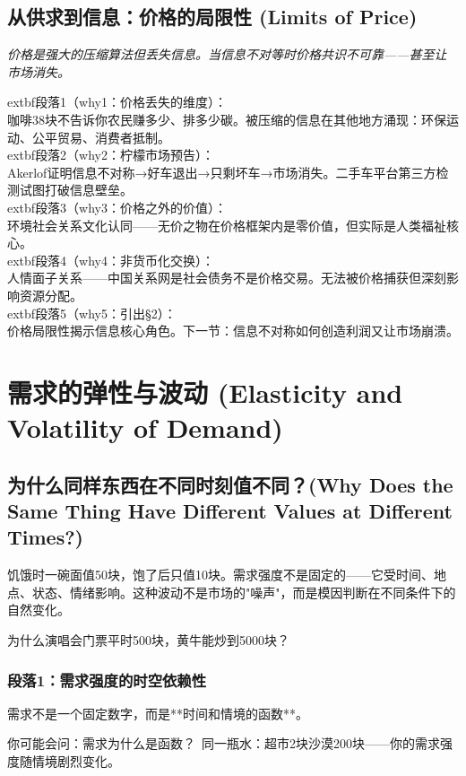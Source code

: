 \documentclass[openany, a4paper, 12pt]{book}
\newenvironment{motivation}{
	\vspace{0.5em}
	\begin{tcolorbox}[
		colback=gray!10,           %
		colframe=gray!60,          %
		title=\textit{本章动机 (Motivation)},
		fonttitle=\bfseries,
		arc=0mm,                   %
		leftrule=3mm               %
		]
		\small \itshape %
	}{
	\end{tcolorbox}
	\vspace{1em}
}
\begin{document}
	\subsection{从供求到信息：价格的局限性 (Limits of Price)}
	\begin{motivation}价格是强大的压缩算法但丢失信息。当信息不对等时价格共识不可靠——甚至让市场消失。\end{motivation}
		extbf{段落1（why1：价格丢失的维度）}：\\咖啡38块不告诉你农民赚多少、排多少碳。被压缩的信息在其他地方涌现：环保运动、公平贸易、消费者抵制。\\	extbf{段落2（why2：柠檬市场预告）}：\\Akerlof证明信息不对称→好车退出→只剩坏车→市场消失。二手车平台第三方检测试图打破信息壁垒。\\	extbf{段落3（why3：价格之外的价值）}：\\环境社会关系文化认同——无价之物在价格框架内是零价值，但实际是人类福祉核心。\\	extbf{段落4（why4：非货币化交换）}：\\人情面子关系——中国关系网是社会债务不是价格交易。无法被价格捕获但深刻影响资源分配。\\	extbf{段落5（why5：引出§2）}：\\价格局限性揭示信息核心角色。下一节：信息不对称如何创造利润又让市场崩溃。


	\section{需求的弹性与波动 (Elasticity and Volatility of Demand)}

	\subsection{为什么同样东西在不同时刻值不同？(Why Does the Same Thing Have Different Values at Different Times?)}
	\begin{motivation}
		饥饿时一碗面值50块，饱了后只值10块。需求强度不是固定的——它受时间、地点、状态、情绪影响。这种波动不是市场的"噪声"，而是模因判断在不同条件下的自然变化。
	\end{motivation}
	\begin{questionbox}
		为什么演唱会门票平时500块，黄牛能炒到5000块？
	\end{questionbox}

	\subsubsection*{段落1：需求强度的时空依赖性}
	需求不是一个固定数字，而是**时间和情境的函数**。
	\begin{tcolorbox}[colback=yellow!5, title=\textit{读者行为预测}]
		你可能会问：需求为什么是函数？\ 同一瓶水：超市2块沙漠200块——你的需求强度随情境剧烈变化。
	\end{tcolorbox}
\end{document}
